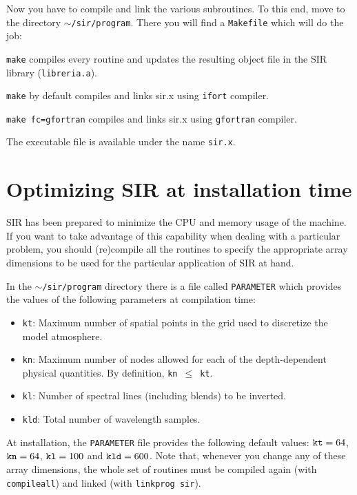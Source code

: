 Now you have to compile and link the various subroutines. To this end,
move to the directory {\tt $\sim$/sir/program}. There you will find
a {\tt Makefile} which will do the job:

{\tt make} compiles every routine and updates the resulting object file in the SIR library ({\tt libreria.a}). 

{\tt make} by default compiles and links sir.x using {\tt ifort} compiler.

{\tt make fc=gfortran} compiles and links sir.x using {\tt gfortran} compiler.

The executable file is available under the name {\tt sir.x}. 

\section{Optimizing SIR at installation time} 
SIR has been prepared to minimize the CPU and memory usage of the
machine. If you want to take advantage of this capability when dealing 
with a particular problem, you should (re)compile all the routines 
to specify the appropriate array dimensions to be used for the particular 
application of SIR at hand.   

In the {\tt $\sim$/sir/program} directory there is a file called 
{\tt PARAMETER} which provides the values of the following 
parameters at compilation time:
\begin{itemize}
\item {\tt kt}: Maximum number of spatial points in the grid used to discretize
the model atmosphere. 
\item {\tt kn}: Maximum number of nodes allowed for each of the depth-dependent
physical quantities. By definition, {\tt kn}~$\leq$~{\tt kt}. 
\item {\tt kl}: Number of spectral lines (including blends) to be inverted.
\item {\tt kld}: Total number of wavelength samples.
\end{itemize}
At installation, the {\tt PARAMETER} file provides the following
default values:  ${\tt kt} =64$, ${\tt kn} = 64$, ${\tt kl}=100$ and
${\tt kld} = 600$. Note that, whenever you change any of these
array dimensions, the whole set of routines must be compiled again 
(with {\tt compileall}) and linked (with {\tt linkprog sir}).

